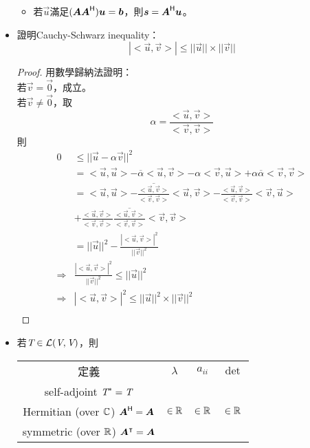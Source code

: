 \begin{itemize}
\begin{itemize}
		\item 若$\vec{u}$滿足$(\boldsymbol{AA}^{\mathsf{H}})\boldsymbol{u} = \boldsymbol{b}$，則$\boldsymbol{s} = \boldsymbol{A}^{\mathsf{H}}\boldsymbol{u}$。
    \end{itemize}
    \item 證明Cauchy-Schwarz inequality：\begin{equation}
		|<\vec{u}, \vec{v}>| \le ||\vec{u}|| \times ||\vec{v}||
	\end{equation} \begin{proof}
		用數學歸納法證明： \\
		若$\vec{v} = \vec{0}$，成立。 \\
		若$\vec{v} \neq \vec{0}$，取\begin{equation}
			\alpha = \frac{<\vec{u}, \vec{v}>}{<\vec{v}, \vec{v}>}
		\end{equation} 則 \begin{equation}
			\begin{aligned}
				0 & \le ||\vec{u} - \alpha\vec{v}||^2 \\
				& = <\vec{u}, \vec{u}> - \overline{\alpha}<\vec{u}, \vec{v}> - \alpha<\vec{v}, \vec{u}> + \alpha\overline{\alpha}<\vec{v}, \vec{v}> \\
				& = <\vec{u}, \vec{u}> - \overline{\frac{<\vec{u}, \vec{v}>}{<\vec{v}, \vec{v}>}}<\vec{u}, \vec{v}> - \frac{<\vec{u}, \vec{v}>}{<\vec{v}, \vec{v}>}<\vec{v}, \vec{u}> \\
				& + \frac{<\vec{u}, \vec{v}>}{<\vec{v}, \vec{v}>}\overline{\frac{<\vec{u}, \vec{v}>}{<\vec{v}, \vec{v}>}}<\vec{v}, \vec{v}> \\
				& = ||\vec{u}||^2 - \frac{|<\vec{u}, \vec{v}>|^2}{||\vec{v}||^2} \\
				\Rightarrow & \frac{|<\vec{u}, \vec{v}>|^2}{||\vec{v}||^2} \le ||\vec{u}||^2 \\
				\Rightarrow & |<\vec{u}, \vec{v}>|^2 \le ||\vec{u}||^2 \times ||\vec{v}||^2 \\
			\end{aligned}
		\end{equation}
    \end{proof}
    \item 若$\textit{T} \in \mathcal{L}(\textit{V}, \textit{V})$，則
	\begin{table}[H]
		\renewcommand{\arraystretch}{2}
		\begin{tabular}{|c|c|c|c|}
			\hline
			定義 & $\lambda$ & $a_{ii}$ & $\det$ \\
			\Xhline{3\arrayrulewidth}
			self-adjoint $\textit{T}^* = \textit{T}$ & \multirow{3}{*}{$\in \mathbb{R}$} 
			& \multirow{3}{*}{$\in \mathbb{R}$} & \multirow{3}{*}{$\in \mathbb{R}$} \\
			Hermitian (over $\mathbb{C}$) $\boldsymbol{A}^{\mathsf{H}} = \boldsymbol{A}$ & & & \\
			\cline{1-1}
			symmetric (over $\mathbb{R}$) $\boldsymbol{A}^\intercal = \boldsymbol{A}$ & & & \\


\end{tabular}
\end{table}
\end{itemize}
